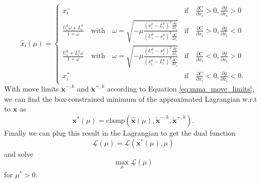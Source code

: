 \begin{equation}
    \hat{x}_i (\mu) = 
    \begin{cases}
        x^-_i 
            &\textrm{if} \quad \frac{\partial C}{\partial x_i} > 0, \frac{\partial g}{\partial x_i} > 0 \\
        \frac{U_i^k\omega + L_i^k}{1+\omega} \quad \text{with} \quad \omega = \sqrt{-\mu\frac{(x_i^k-L_i^k)^2\frac{\partial g}{\partial x_i}}{(U_i^k-x_i^k)^2\frac{\partial C}{\partial x_i}}}
            &\textrm{if} \quad \frac{\partial C}{\partial x_i}  > 0, \frac{\partial g}{\partial x_i} <0\\
        \frac{U_i^k + L_i^k\omega}{1+\omega} \quad \text{with} \quad \omega = \sqrt{-\mu\frac{(U_i^k-x_i^k)^2\frac{\partial g}{\partial x_i}}{(x_i^k-L_i^k)^2\frac{\partial C}{\partial x_i}}} 
            &\textrm{if} \quad \frac{\partial C}{\partial x_i} < 0, \frac{\partial g}{\partial x_i}  > 0\\
        x^+_i 
            &\textrm{if} \quad \frac{\partial C}{\partial x_i}< 0, \frac{\partial g}{\partial x_i} < 0.
    \end{cases}
\end{equation}
With move limits $\tilde{\mathbf{x}}^{-,k}$ and $\tilde{\mathbf{x}}^{+,k}$ according to Equation \eqref{eq:mma_move_limits}, we can find the box-constrained minimum of the approximated Lagrangian w.r.t to $\mathbf{x}$ as
\begin{equation}
    \mathbf{x}^*(\mu) = \textrm{clamp}\left(\hat{\mathbf{x}}(\mu), \tilde{\mathbf{x}}^{-,k}, \tilde{\mathbf{x}}^{+,k} \right).
\end{equation}
Finally we can plug this result in the Lagrangian to get the dual function 
\begin{equation}
    \underline{\mathcal{L}}(\mu) = \mathcal{L}(\mathbf{x}^* (\mu), \mu)
\end{equation}
and solve 
\begin{equation}
    \max_{\mu} \underline{\mathcal{L}}(\mu)
    \label{eq:shape_dual_solution}
\end{equation}
for $\mu^*>0$. 

